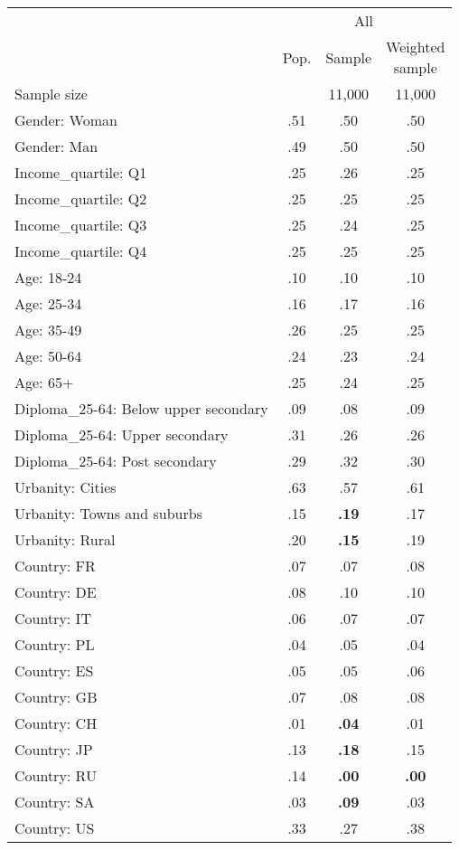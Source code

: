 
\begin{tabular}[t]{lccc}
\toprule
\multicolumn{1}{c}{} & \multicolumn{3}{c}{All} \\
\cmidrule(l{3pt}r{3pt}){2-4}
  & Pop. & Sample & \makecell{Weighted\\sample}\\
\midrule
Sample size &  & 11,000 & 11,000\\
\addlinespace
Gender: Woman & .51 & .50 & .50\\
Gender: Man & .49 & .50 & .50\\
\addlinespace
Income\_quartile: Q1 & .25 & .26 & .25\\
Income\_quartile: Q2 & .25 & .25 & .25\\
Income\_quartile: Q3 & .25 & .24 & .25\\
Income\_quartile: Q4 & .25 & .25 & .25\\
\addlinespace
Age: 18-24 & .10 & .10 & .10\\
Age: 25-34 & .16 & .17 & .16\\
Age: 35-49 & .26 & .25 & .25\\
Age: 50-64 & .24 & .23 & .24\\
Age: 65+ & .25 & .24 & .25\\
\addlinespace
Diploma\_25-64: Below upper secondary & .09 & .08 & .09\\
Diploma\_25-64: Upper secondary & .31 & .26 & .26\\
Diploma\_25-64: Post secondary & .29 & .32 & .30\\
\addlinespace
Urbanity: Cities & .63 & .57 & .61\\
Urbanity: Towns and suburbs & .15 & \textbf{.19} & .17\\
Urbanity: Rural & .20 & \textbf{.15} & .19\\
\addlinespace
Country: FR & .07 & .07 & .08\\
Country: DE & .08 & .10 & .10\\
Country: IT & .06 & .07 & .07\\
Country: PL & .04 & .05 & .04\\
Country: ES & .05 & .05 & .06\\
Country: GB & .07 & .08 & .08\\
Country: CH & .01 & \textbf{.04} & .01\\
Country: JP & .13 & \textbf{.18} & .15\\
Country: RU & .14 & \textbf{.00} & \textbf{.00}\\
Country: SA & .03 & \textbf{.09} & .03\\
Country: US & .33 & .27 & .38\\
\bottomrule
\end{tabular}